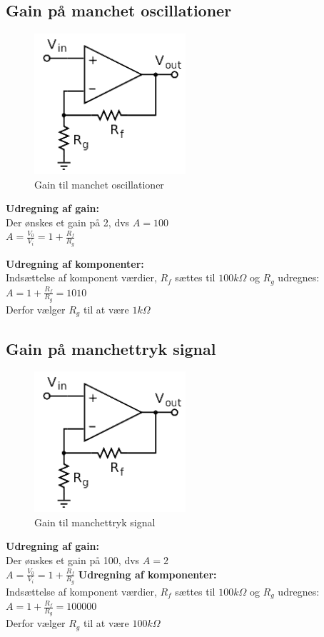 \subsection{Gain på manchet oscillationer }
\begin{figure}[H]
	\centering
	\includegraphics[width = 0.5\textwidth]{billeder/OpAMP_gain.png}
	\caption{Gain til manchet oscillationer}\label{fig:opam1}
\end{figure}
\textbf{Udregning af gain: } \\
Der ønskes et gain på 2, dvs $A = 100$ \\
$ A = \frac{V_0}{V_i} = 1 + \frac{R_f}{R_g}$

\textbf{Udregning af komponenter:}\\
Indsættelse af komponent værdier, $R_f$ sættes til $100k\Omega$ og $R_g$ udregnes: \\
$ A = 1 + \frac{R_f}{R_g} = 1010$ \\
Derfor vælger $R_g$ til at være $1k\Omega$

\subsection{Gain på manchettryk signal }
\begin{figure}[H]
	\centering
	\includegraphics[width = 0.5\textwidth]{billeder/OpAMP_gain.png}
	\caption{Gain til manchettryk signal}\label{fig:opam2}
\end{figure}
\textbf{Udregning af gain: } \\
Der ønskes et gain på 100, dvs $A = 2$ \\
$ A = \frac{V_0}{V_i} = 1 + \frac{R_f}{R_g}$
\textbf{Udregning af komponenter:}\\
Indsættelse af komponent værdier, $R_f$ sættes til $100k\Omega$ og $R_g$ udregnes: \\
$ A = 1 + \frac{R_f}{R_g} = 100000$ \\
Derfor vælger $R_g$ til at være $100k\Omega$